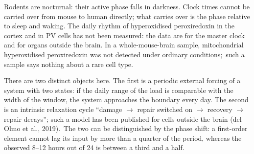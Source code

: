 \begin{note}
Rodents are nocturnal: their active phase falls in darkness. Clock times cannot be carried over from mouse to human directly; what carries over is the phase relative to sleep and waking. The daily rhythm of hyperoxidised peroxiredoxin in the cortex and in PV cells has not been measured: the data are for the master clock and for organs outside the brain. In a whole-mouse-brain sample, mitochondrial hyperoxidised peroxiredoxin was not detected under ordinary conditions;\tS\ such a sample says nothing about a rare cell type.
\end{note}
\begin{ineq}
There are two distinct objects here. The first is a periodic external forcing of a system with two states: if the daily range of the load is comparable with the width of the window, the system approaches the boundary every day. The second is an intrinsic relaxation cycle ``damage $\to$ repair switched on $\to$ recovery $\to$ repair decays''; such a model has been published for cells outside the brain (del Olmo et al., 2019).\tS\ The two can be distinguished by the phase shift: a first-order element cannot lag its input by more than a quarter of the period, whereas the observed 8--12 hours out of 24 is between a third and a half.\tD
\end{ineq}
